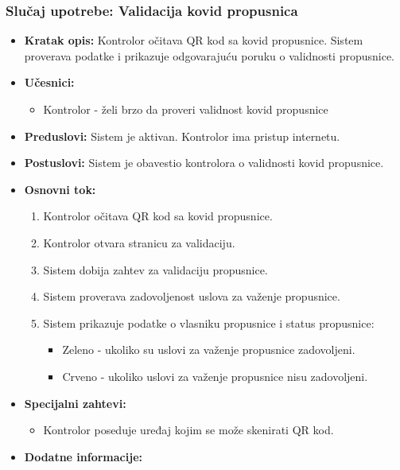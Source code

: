\documentclass[titlepage]{article}
\begin{document}
\subsubsection{Slučaj upotrebe: Validacija kovid propusnica}

\begin{itemize}
    \item \textbf{Kratak opis:} Kontrolor očitava QR kod sa kovid propusnice. Sistem proverava podatke i prikazuje odgovarajuću poruku o validnosti propusnice.
    \item \textbf{Učesnici:}
        \begin{itemize}
            \item Kontrolor - želi brzo da proveri validnost kovid propusnice
        \end{itemize}
    \item \textbf{Preduslovi:} Sistem je aktivan. Kontrolor ima pristup internetu.
    \item \textbf{Postuslovi:} Sistem je obavestio kontrolora o validnosti kovid propusnice.
    \item \textbf{Osnovni tok:}
        \begin{enumerate}
            \item Kontrolor očitava QR kod sa kovid propusnice.
            \item Kontrolor otvara stranicu za validaciju.
            \item Sistem dobija zahtev za validaciju propusnice.
            \item Sistem proverava zadovoljenost uslova za važenje propusnice.
            \item Sistem prikazuje podatke o vlasniku propusnice i status propusnice:
                \begin{itemize}
                    \item Zeleno - ukoliko su uslovi za važenje propusnice zadovoljeni.
                    \item Crveno - ukoliko uslovi za važenje propusnice nisu zadovoljeni.
                \end{itemize}
        \end{enumerate}
    \item \textbf{Specijalni zahtevi:}
        \begin{itemize}
            \item Kontrolor poseduje uređaj kojim se može skenirati QR kod.
        \end{itemize}
    \item \textbf{Dodatne informacije:}

\end{itemize}
\end{document}
